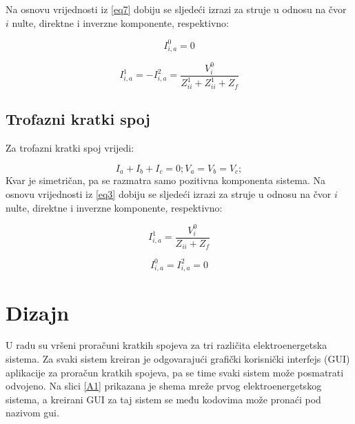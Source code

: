 \documentclass[a4paper, 12pt]{article}
\numberwithin{figure}{section}
\numberwithin{equation}{section}
\begin{document}
Na osnovu vrijednosti iz \ref{eq7} dobiju se sljedeći izrazi za struje u odnosu na čvor $i$ nulte, direktne i inverzne komponente, respektivno:

\begin{equation}
I^{0}_{i,a}  = 0
    \label{eq8}
\end{equation}

\begin{equation}
I^{1}_{i,a} = -I^{2}_{i,a} = \frac{V^{0}_{i}}{Z^{1}_{ii} + Z^{1}_{ii} + Z_{f}}
    \label{eq9}
\end{equation}

\subsection{Trofazni kratki spoj}

Za trofazni kratki spoj \cite{b2} vrijedi:

\begin{equation}
    I_{a} + I_{b} +I_{c} = 0;
    V_{a} = V_{b} = V_{c};
    \label{eq10}
\end{equation}
Kvar je simetričan, pa se razmatra samo pozitivna komponenta sistema. 
Na osnovu vrijednosti iz \ref{eq3} dobiju se sljedeći izrazi za struje u odnosu na čvor $i$ nulte, direktne i inverzne komponente, respektivno:

\begin{equation}
I^{1}_{i,a}  = \frac{V^{0}_{i}}{Z_{ii} + Z_{f}}
    \label{eq11}
\end{equation}

\begin{equation}I^{0}_{i,a} = I^{2}_{i,a} = 0
    \label{eq12}
\end{equation}













\newpage
\section{Dizajn}
U radu su vršeni proračuni kratkih spojeva za tri različita elektroenergetska sistema. Za svaki sistem kreiran je odgovarajući grafički korisnički interfejs (GUI) aplikacije za proračun kratkih spojeva, pa se time svaki sistem može posmatrati odvojeno. Na slici \ref{A1} prikazana je shema mreže prvog elektroenergetskog sistema, a kreirani GUI za taj sistem se među kodovima može pronaći pod nazivom gui.
\end{document}
